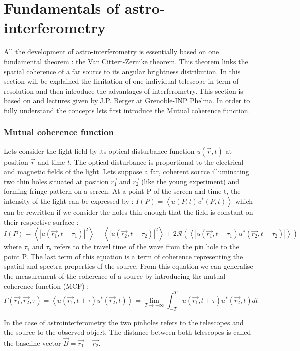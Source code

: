 \section{Fundamentals of astro-interferometry}
All the development of astro-interferometry is essentially based on one fundamental theorem : the Van Cittert-Zernike theorem. This theorem links the spatial coherence of a far source to its angular brightness distribution. In this section will be explained the limitation of one individual telescope in term of resolution and then introduce the advantages of interferometry. This section is based on \cite{Glindemann} and lectures given by J.P. Berger at Grenoble-INP Phelma. In order to fully understand the concepts lets first introduce the Mutual coherence function.

	\subsubsection{Mutual coherence function}
Lets consider the light field by its optical disturbance function $u(\vec{r},t)$ at position $\vec{r}$ and time $t$. The optical disturbance is proportional to the electrical and magnetic fields of the light.
Lets suppose a far, coherent source illuminating two thin holes situated at position $\vec{r_1}$ and $\vec{r_2}$ (like the young experiment) and forming fringe pattern on a screen. At a point P of the screen and time t, the intensity of the light can be expressed by :
$I(P) = \left< u(P,t)u^*(P,t) \right>$ which can be rewritten if we consider the holes thin enough that the field is constant on their respective surface :
$$
I(P) = \left< \left| u(\vec{r_1},t-\tau_1) \right|^2 \right> + \left< \left| u(\vec{r_2},t-\tau_2) \right|^2 \right> +2\mathcal{R}\left( \left< \left| u(\vec{r_1},t-\tau_1)u^*(\vec{r_2},t-\tau_2) \right| \right> \right)
$$
where $\tau_1$ and $\tau_2$ refers to the travel time of the wave from the pin hole to the point P. The last term of this equation is a term of coherence representing the spatial and spectra properties of the source. From this equation we can generalise the measurement of the coherence of a source by introducing the mutual coherence function (MCF) :
\begin{equation}
\Gamma(\vec{r_1},\vec{r_2}, \tau) = \left< u(\vec{r_1},t+\tau)u^*(\vec{r_2},t)\right> = \lim\limits_{T\rightarrow +\infty}\int_{-T}^T u(\vec{r_1},t+\tau)u^*(\vec{r_2},t)dt
\end{equation} 

In the case of astrointerferometry the two pinholes refers to the telescopes and the source to the observed object. The distance between both telescopes is called the baseline vector $\vec{B}=\vec{r_1}-\vec{r_2}$. 


